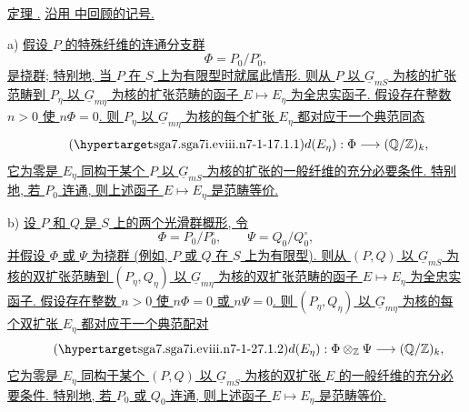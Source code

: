 \medskip
\noindent\underline{定理 .} \underline{沿用  中回顾的记号.}

\smallskip
\noindent a) \underline{假设 $P$ 的特殊纤维的连通分支群}
\[
 \Phi=P_0/P_0^{\circ},
\]
\underline{是挠群; 特别地, 当 $P$ 在 $S$ 上为有限型时就属此情形. 则从 $P$ 以 $\underline G_{mS}$ 为核的扩张范畴到 $P_\eta$ 以 $\underline G_{m\eta}$ 为核的扩张范畴的函子 $E\mapsto E_\eta$ 为全忠实函子. 假设存在整数 $n>0$ 使 $n\Phi=0$. 则 $P_\eta$ 以 $\underline G_{m\eta}$ 为核的每个扩张 $E_\eta$ 都对应于一个典范同态}
\begin{equation}\tag{\SGARefTarget{sga7.sga7i.eviii.n7-1-1}{7.1.1}}
 d(E_\eta):\Phi\longrightarrow(\mathbb Q/\mathbb Z)_k,
\end{equation}
\underline{它为零是 $E_\eta$ 同构于某个 $P$ 以 $\underline G_{mS}$ 为核的扩张的一般纤维的充分必要条件. 特别地, 若 $P_0$ 连通, 则上述函子 $E\mapsto E_\eta$ 是范畴等价.}

\smallskip
\noindent b) \underline{设 $P$ 和 $Q$ 是 $S$ 上的两个光滑群概形, 令}
\[
 \Phi=P_0/P_0^{\circ},\qquad \Psi=Q_0/Q_0^{\circ},
\]
\underline{并假设 $\Phi$ 或 $\Psi$ 为挠群 (例如, $P$ 或 $Q$ 在 $S$ 上为有限型). 则从 $(P,Q)$ 以 $\underline G_{mS}$ 为核的双扩张范畴到 $(P_\eta,Q_\eta)$ 以 $\underline G_{m\eta}$ 为核的双扩张范畴的函子 $E\mapsto E_\eta$ 为全忠实函子. 假设存在整数 $n>0$ 使 $n\Phi=0$ 或 $n\Psi=0$. 则 $(P_\eta,Q_\eta)$ 以 $\underline G_{m\eta}$ 为核的每个双扩张 $E_\eta$ 都对应于一个典范配对}
\begin{equation}\tag{\SGARefTarget{sga7.sga7i.eviii.n7-1-2}{7.1.2}}
 d(E_\eta):\Phi\otimes_{\mathbb Z}\Psi
 \longrightarrow(\mathbb Q/\mathbb Z)_k,
\end{equation}
\underline{它为零是 $E_\eta$ 同构于某个 $(P,Q)$ 以 $\underline G_{mS}$ 为核的双扩张 $E$ 的一般纤维的充分必要条件. 特别地, 若 $P_0$ 或 $Q_0$ 连通, 则上述函子 $E\mapsto E_\eta$ 是范畴等价.}




